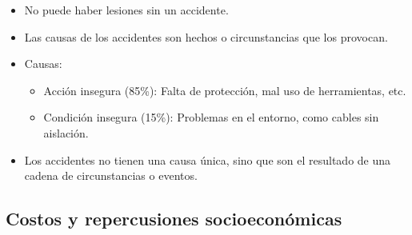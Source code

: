\documentclass{article} %
\begin{document}
\begin{itemize}[label={},left=0pt,align=parleft]
    \item \begin{highlightbox}[levelone] No puede haber lesiones sin un accidente. \end{highlightbox}
    \item \begin{highlightbox}[levelone] Las causas de los accidentes son hechos o circunstancias que los provocan. \end{highlightbox}
    \item \begin{highlightbox}[levelone] Causas: \end{highlightbox}
    \begin{itemize}[label={},left=1em,align=parleft]
        \item \begin{highlightbox}[leveltwo] Acción insegura (85\%): Falta de protección, mal uso de herramientas, etc. \end{highlightbox}
        \item \begin{highlightbox}[leveltwo] Condición insegura (15\%): Problemas en el entorno, como cables sin aislación. \end{highlightbox}
    \end{itemize}
    \item \begin{highlightbox}[levelone] Los accidentes no tienen una causa única, sino que son el resultado de una cadena de circunstancias o eventos. \end{highlightbox}
\end{itemize}

\subsection{Costos y repercusiones socioeconómicas}
\end{document}
